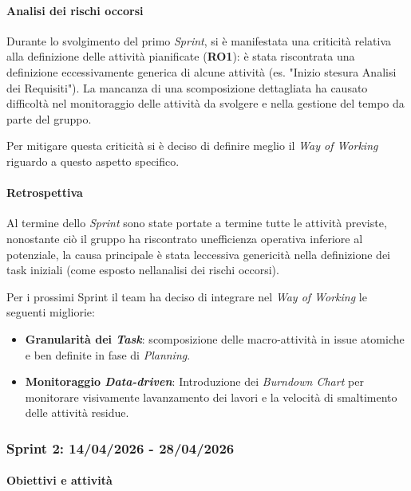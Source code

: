\documentclass[12pt, a4paper]{article}
\begin{document}
{\paragraph{Analisi dei rischi occorsi}\label{analisi-dei-rischi-occorsi}

Durante lo svolgimento del primo \emph{Sprint}, si è manifestata una
criticità relativa alla definizione delle attività pianificate
(\textbf{RO1}): è stata riscontrata una definizione eccessivamente
generica di alcune attività (es. "Inizio stesura Analisi dei
Requisiti"). La mancanza di una scomposizione dettagliata ha causato
difficoltà nel monitoraggio delle attività da svolgere e nella gestione
del tempo da parte del gruppo.

Per mitigare questa criticità si è deciso di definire meglio il
\emph{Way of Working} riguardo a questo aspetto specifico.

\paragraph{Retrospettiva}\label{retrospettiva}

Al termine dello \emph{Sprint} sono state portate a termine tutte le
attività previste, nonostante ciò il gruppo ha riscontrato
un\textquotesingle efficienza operativa inferiore al potenziale, la
causa principale è stata l\textquotesingle eccessiva genericità nella
definizione dei task iniziali (come esposto nell\textquotesingle analisi
dei rischi occorsi).

Per i prossimi Sprint il team ha deciso di integrare nel \emph{Way of
Working} le seguenti migliorie:

\begin{itemize}
\item
  \textbf{Granularità dei \emph{Task}}: scomposizione delle
  macro-attività in issue atomiche e ben definite in fase di
  \emph{Planning}.
\item
  \textbf{Monitoraggio \emph{Data-driven}}: Introduzione dei
  \emph{Burndown Chart} per monitorare visivamente
  l\textquotesingle avanzamento dei lavori e la velocità di smaltimento
  delle attività residue.
\end{itemize}

\subsubsection{Sprint 2: 14/04/2026 - 28/04/2026}

\paragraph{Obiettivi e attività}

}
\end{document}
